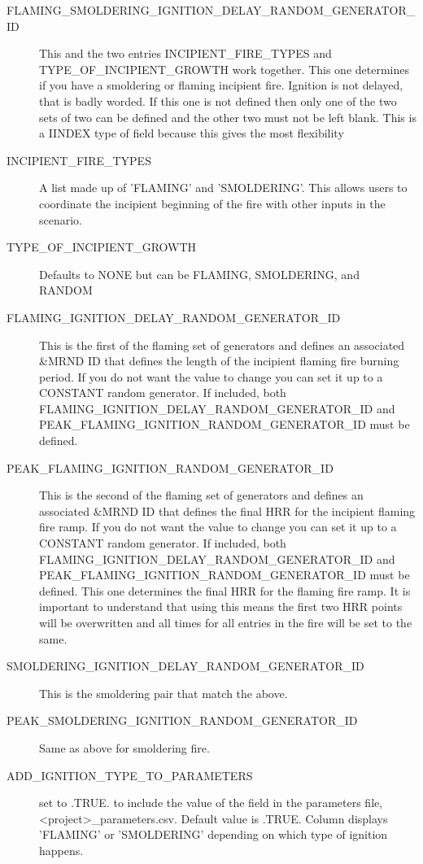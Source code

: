 \documentclass[12pt,twoside]{book}
\begin{document}
 \begin{description}
  \item[FLAMING\_SMOLDERING\_IGNITION\_DELAY\_RANDOM\_GENERATOR\_ID] This and the two entries {\ct INCIPIENT\_FIRE\_TYPES} and {\ct TYPE\_OF\_INCIPIENT\_GROWTH} work together. This one determines if you have a smoldering or flaming incipient fire. Ignition is not delayed, that is badly worded. If this one is not defined then only one of the two sets of two can be defined and the other two must not be left blank. This is a I{\ct INDEX} type of field because this gives the most flexibility
  \item[INCIPIENT\_FIRE\_TYPES] A list made up of 'FLAMING' and 'SMOLDERING'. This allows users to coordinate the incipient beginning of the fire with other inputs in the scenario.
  \item[TYPE\_OF\_INCIPIENT\_GROWTH] Defaults to {\ct NONE} but can be {\ct FLAMING}, {\ct SMOLDERING}, and {\ct RANDOM}
  \item[FLAMING\_IGNITION\_DELAY\_RANDOM\_GENERATOR\_ID] This is the first of the flaming set of generators and defines an associated {\ct \&MRND} ID that defines the length of the incipient flaming fire burning period. If you do not want the value to change you can set it up to a {\ct CONSTANT} random generator. If included, both {\ct FLAMING\_IGNITION\_DELAY\_RANDOM\_GENERATOR\_ID} and {\ct PEAK\_FLAMING\_IGNITION\_RANDOM\_GENERATOR\_ID} must be defined.
  \item[PEAK\_FLAMING\_IGNITION\_RANDOM\_GENERATOR\_ID] This is the second of the flaming set of generators and defines an associated {\ct \&MRND} ID that defines the final HRR for the incipient flaming fire ramp. If you do not want the value to change you can set it up to a {\ct CONSTANT} random generator. If included, both {\ct FLAMING\_IGNITION\_DELAY\_RANDOM\_GENERATOR\_ID} and {\ct PEAK\_FLAMING\_IGNITION\_RANDOM\_GENERATOR\_ID} must be defined. This one determines the final HRR for the flaming fire ramp. It is important to understand that using this means the first two HRR points will be overwritten and all times for all entries in the fire will be set to the same.
  \item[SMOLDERING\_IGNITION\_DELAY\_RANDOM\_GENERATOR\_ID] This is the smoldering pair that match the above.
  \item[PEAK\_SMOLDERING\_IGNITION\_RANDOM\_GENERATOR\_ID] Same as above for smoldering fire.
  \item[ADD\_IGNITION\_TYPE\_TO\_PARAMETERS] set to .TRUE. to include the value of the field in the parameters file, {\ct <project>\_parameters.csv}. Default value is .TRUE. Column displays 'FLAMING' or 'SMOLDERING' depending on which type of ignition happens.

\end{description}
\end{document}
